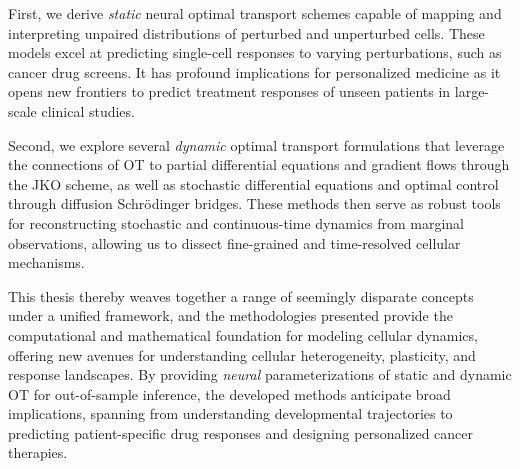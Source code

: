 First, we derive \emph{static} neural optimal transport schemes capable of mapping and interpreting unpaired distributions of perturbed and unperturbed cells. These models excel at predicting single-cell responses to varying perturbations, such as cancer drug screens.
It has profound implications for personalized medicine as it opens new frontiers to predict treatment responses of unseen patients in large-scale clinical studies.

Second, we explore several \emph{dynamic} optimal transport formulations that leverage the connections of OT to partial differential equations and gradient flows through the \acrfull{JKO} scheme, as well as stochastic differential equations and optimal control through diffusion Schr{\"o}dinger bridges. These methods then serve as robust tools for reconstructing stochastic and continuous-time dynamics from marginal observations, allowing us to dissect fine-grained and time-resolved cellular mechanisms.

This thesis thereby weaves together a range of seemingly disparate concepts under a unified framework, and the methodologies presented provide the computational and mathematical foundation for modeling cellular dynamics, offering new avenues for understanding cellular heterogeneity, plasticity, and response landscapes.
By providing \emph{neural} parameterizations of static and dynamic OT for out-of-sample inference, the developed methods anticipate broad implications, spanning from understanding developmental trajectories to predicting patient-specific drug responses and designing personalized cancer therapies.


\endgroup

\cleardoublepage%

